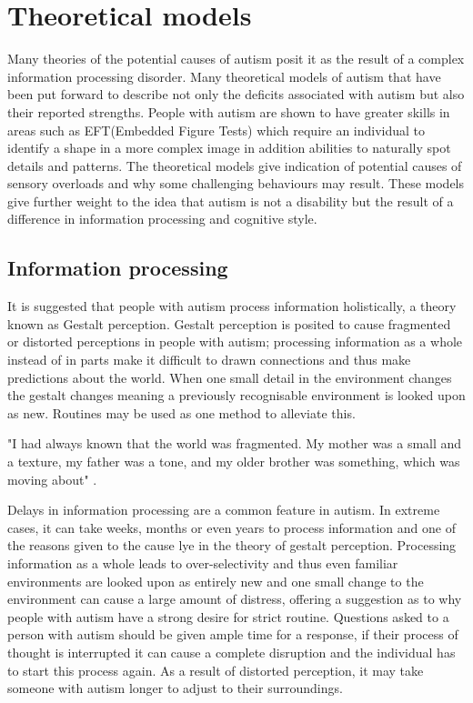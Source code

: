 \section{Theoretical models}
Many theories of the potential causes of autism posit it as the result of a complex information processing disorder\cite{minshewmodel}. Many theoretical models of autism that have been put forward to describe not only the deficits associated with autism but also their reported strengths. People with autism are shown to have greater skills in areas such as EFT(Embedded Figure Tests) which require an individual to identify a shape in a more complex image in addition abilities to naturally spot details and patterns. The theoretical models give indication of potential causes of sensory overloads and why some challenging behaviours may result. These models give further weight to the idea that autism is not a disability but the result of a difference in information processing and cognitive style. 

\subsection{Information processing}

It is suggested that people with autism process information holistically, a theory known as Gestalt perception. Gestalt perception is posited to cause fragmented or distorted perceptions in people with autism\cite{olgab}; processing information as a whole instead of in parts make it difficult to drawn connections and thus make predictions about the world. When one small detail in the environment changes the gestalt changes meaning a previously recognisable environment is looked upon as new. Routines may be used as one method to alleviate this.

"I had always known that the world was fragmented. My mother was a small and a texture, my father was a tone, and my older brother was something, which was moving about" \cite{williams1992}. 

Delays in information processing are a common feature in autism. In extreme cases, it can take weeks, months or even years to process information and one of the reasons given to the cause lye in the theory of gestalt perception. Processing information as a whole leads to over-selectivity and thus even familiar environments are looked upon as entirely new and one small change to the environment can cause a large amount of distress\cite{olgab}, offering a suggestion as to why people with autism have a strong desire for strict routine. Questions asked to a person with autism should be given ample time for a response, if their process of thought is interrupted it can cause a complete disruption and the individual has to start this process again\cite{olgab}. As a result of distorted perception, it may take someone with autism longer to adjust to their surroundings.

